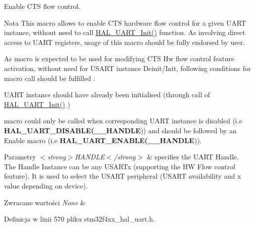 Enable C\+TS flow control. 

\begin{DoxyNote}{Nota}
This macro allows to enable C\+TS hardware flow control for a given U\+A\+RT instance, without need to call \hyperlink{group___u_a_r_t___exported___functions___group1_gabe47045024787099b0bfa82bbe7b0b6a}{H\+A\+L\+\_\+\+U\+A\+R\+T\+\_\+\+Init()} function. As involving direct access to U\+A\+RT registers, usage of this macro should be fully endorsed by user. 

As macro is expected to be used for modifying C\+TS Hw flow control feature activation, without need for U\+S\+A\+RT instance Deinit/\+Init, following conditions for macro call should be fulfilled \+:
\begin{DoxyItemize}
\item U\+A\+RT instance should have already been initialised (through call of \hyperlink{group___u_a_r_t___exported___functions___group1_gabe47045024787099b0bfa82bbe7b0b6a}{H\+A\+L\+\_\+\+U\+A\+R\+T\+\_\+\+Init()} )
\item macro could only be called when corresponding U\+A\+RT instance is disabled (i.\+e {\bfseries H\+A\+L\+\_\+\+U\+A\+R\+T\+\_\+\+D\+I\+S\+A\+B\+LE(\+\_\+\+\_\+\+H\+A\+N\+D\+LE})) and should be followed by an Enable macro (i.\+e {\bfseries H\+A\+L\+\_\+\+U\+A\+R\+T\+\_\+\+E\+N\+A\+B\+LE(\+\_\+\+\_\+\+H\+A\+N\+D\+LE})). 
\end{DoxyItemize}
\end{DoxyNote}

\begin{DoxyParams}{Parametry}
{\em $<$strong$>$\+H\+A\+N\+D\+L\+E$<$/strong$>$} & specifies the U\+A\+RT Handle. The Handle Instance can be any U\+S\+A\+R\+Tx (supporting the HW Flow control feature). It is used to select the U\+S\+A\+RT peripheral (U\+S\+A\+RT availability and x value depending on device). \\
\hline
\end{DoxyParams}

\begin{DoxyRetVals}{Zwracane wartości}
{\em None} & \\
\hline
\end{DoxyRetVals}


Definicja w linii 570 pliku stm32f4xx\+\_\+hal\+\_\+uart.\+h.

\mbox{\label{group___u_a_r_t___exported___macros_ga8c034e96ad8f263cafeb5898ff7311fd}} 
